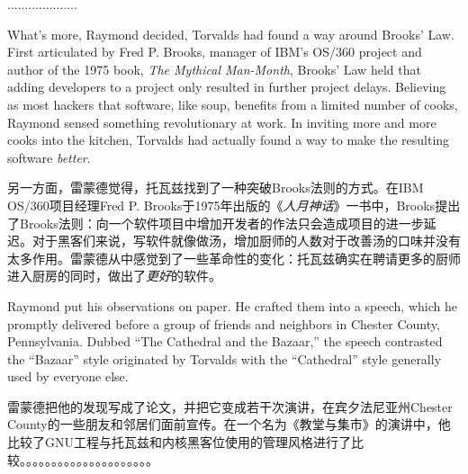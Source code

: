 \ifdefined\chs
....................
\fi

\ifdefined\eng
What's more, Raymond decided, Torvalds had found a way around Brooks' Law. First articulated by Fred P. Brooks, manager of IBM's OS/360 project and author of the 1975 book, \textit{The Mythical Man-Month}, Brooks' Law held that adding developers to a project only resulted in further project delays. Believing as most hackers that software, like soup, benefits from a limited number of cooks, Raymond sensed something revolutionary at work. In inviting more and more cooks into the kitchen, Torvalds had actually found a way to make the resulting software \textit{better}.
\fi

\ifdefined\chs
另一方面，雷蒙德觉得，托瓦兹找到了一种突破Brooks法则的方式。在IBM OS/360项目经理Fred P. Brooks于1975年出版的《\textit{人月神话}》一书中，Brooks提出了Brooks法则：向一个软件项目中增加开发者的作法只会造成项目的进一步延迟。对于黑客们来说，写软件就像做汤，增加厨师的人数对于改善汤的口味并没有太多作用。雷蒙德从中感觉到了一些革命性的变化：托瓦兹确实在聘请更多的厨师进入厨房的同时，做出了\textit{更好}的软件。
\fi

\ifdefined\eng
Raymond put his observations on paper. He crafted them into a speech, which he promptly delivered before a group of friends and neighbors in Chester County, Pennsylvania. Dubbed ``The Cathedral and the Bazaar,'' the speech contrasted the ``Bazaar'' style originated by Torvalds with the ``Cathedral'' style generally used by everyone else.
\fi

\ifdefined\chs
雷蒙德把他的发现写成了论文，并把它变成若干次演讲，在宾夕法尼亚州Chester County的一些朋友和邻居们面前宣传。在一个名为《教堂与集市》的演讲中，他比较了GNU工程与托瓦兹和内核黑客位使用的管理风格进行了比较。。。。。。。。。。。。。。。。。。。。。
\fi

